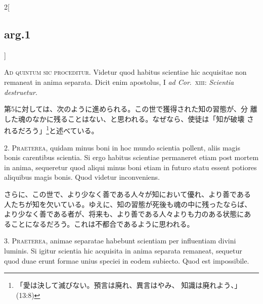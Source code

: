 \documentclass[paper=a4paper,fontsize=10pt,jafontsize=9pt,titlepage]{jlreq}
\begin{document}
\begin{paracol}{2}[\subsection{arg.1}]

{\huge A}{\scshape d quintum sic proceditur}. Videtur quod habitus
scientiae hic acquisitae non remaneat in anima separata. Dicit enim
apostolus, I {\itshape ad Cor}.~{\scshape xiii}: {\itshape Scientia destruetur}.

\switchcolumn

第5に対しては、次のように進められる。この世で獲得された知の習態が、分
離した魂のなかに残ることはない、と思われる。なぜなら、使徒は「知が破壊
されるだろう」\footnote{「愛は決して滅びない。預言は廃れ、異言はやみ、
知識は廃れよう、」(13:8)}と述べている。


2. {\scshape Praeterea}, quidam minus boni in hoc mundo scientia pollent,
aliis magis bonis carentibus scientia. Si ergo habitus scientiae
permaneret etiam post mortem in anima, sequeretur quod aliqui minus
boni etiam in futuro statu essent potiores aliquibus magis bonis. Quod
videtur inconveniens.

\switchcolumn

さらに、この世で、より少なく善である人々が知において優れ、より善である
人たちが知を欠いている。ゆえに、知の習態が死後も魂の中に残ったならば、
より少なく善である者が、将来も、より善である人々よりも力のある状態にあ
ることになるだろう。これは不都合であるように思われる。


3. {\scshape Praeterea}, animae separatae habebunt scientiam per
influentiam divini luminis. Si igitur scientia hic acquisita in anima
separata remaneat, sequetur quod duae erunt formae unius speciei in
eodem subiecto. Quod est impossibile.


\end{paracol}
\end{document}

